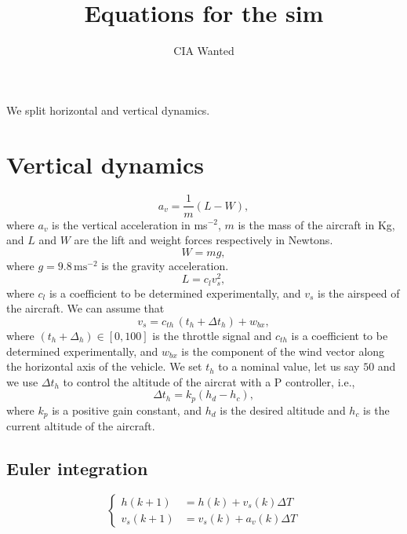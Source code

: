 \documentclass[11pt,a4paper,titlepage]{article}
\title{Equations for the sim}
\author{CIA Wanted}
\begin{document}
\maketitle
We split horizontal and vertical dynamics.

\section{Vertical dynamics}
\begin{equation}
	a_v = \frac{1}{m} (L - W),
\end{equation}
where $a_v$ is the vertical acceleration in ms$^{-2}$, $m$ is the mass of the aircraft in Kg, and $L$ and $W$ are the lift and weight forces respectively in Newtons.
\begin{equation}
W = mg,
\end{equation}
where $g = 9.8 \, \text{ms}^{-2}$ is the gravity acceleration.
\begin{equation}
L = c_l v_s^2,
\end{equation}
where $c_l$ is a coefficient to be determined experimentally, and $v_s$ is the airspeed of the aircraft. We can assume that
\begin{equation}
	v_s = c_{th}\, (t_h + \Delta t_h) + w_{bx},
\end{equation}
where $(t_h + \Delta_h) \in [0,100]$ is the throttle signal and $c_{th}$ is a coefficient to be determined experimentally, and $w_{bx}$ is the component of the wind vector along the horizontal axis of the vehicle. We set $t_h$ to a nominal value, let us say $50$ and we use $\Delta t_h$ to control the altitude of the aircrat with a P controller, i.e., 
\begin{equation}
	\Delta t_h = k_p (h_d - h_c),
\end{equation}
where $k_p$ is a positive gain constant, and $h_d$ is the desired altitude and $h_c$ is the current altitude of the aircraft.

\subsection{Euler integration}
\begin{equation}
	\begin{cases}
		h(k+1) &= h(k) + v_s(k) \Delta T \\
		v_s(k+1) & = v_s(k) + a_v(k) \Delta T
	\end{cases}
\end{equation}
\end{document}
